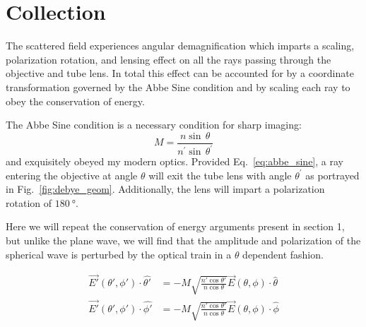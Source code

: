 

\section{Collection}
The scattered field experiences angular demagnification 
which imparts a scaling, polarization rotation, and lensing effect on all the rays passing
through the objective and tube lens. In total this effect can be accounted for by
a coordinate transformation governed by the Abbe Sine condition and by scaling
each ray to obey the conservation of energy.

The Abbe Sine condition is a necessary condition for sharp imaging:
\begin{equation*}
  M = \frac{n \sin \, \theta}{n^{\prime} \sin \, \theta^{\prime}}
  \label{eq:abbe_sine}
\end{equation*}
  and exquisitely obeyed my modern optics. Provided Eq.~\eqref{eq:abbe_sine}, a ray entering
  the objective at angle $\theta$ will exit the tube lens with angle $\theta^{\prime}$ as
  portrayed in Fig.~\ref{fig:debye_geom}. Additionally, the lens will impart a polarization
  rotation of $\SI{180}{\degree}$.

Here we will repeat the conservation of energy arguments present in section
1, but unlike the plane wave, we will find that the amplitude and 
polarization of the spherical wave is perturbed by the optical train in a 
$\theta$ dependent fashion. 

  \begin{equation*}
    \begin{split}
    \vec{E'}(\theta', \phi')\cdot\hat{\theta'} & = - M \sqrt{ \frac{n'\cos{\theta'}}{n\cos{\theta}}}\vec{E}(\theta, \phi)\cdot\hat{\theta}\\
    \vec{E'}(\theta', \phi')\cdot\hat{\phi'} & = - M \sqrt{ \frac{n'\cos{\theta'}}{n\cos{\theta}}}\vec{E}(\theta, \phi)\cdot\hat{\phi}
    \end{split}
  \end{equation*}

